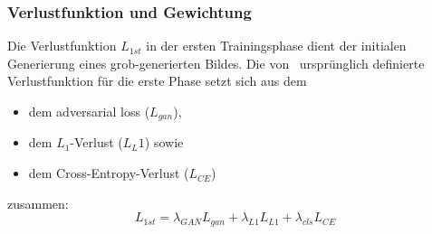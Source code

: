 \subsubsection{Verlustfunktion und Gewichtung}
Die Verlustfunktion $L_{1st}$ in der ersten Trainingsphase dient der initialen Generierung eines grob-generierten Bildes. Die von~\textcite{He_2023_ICCV} ursprünglich definierte Verlustfunktion für die erste Phase setzt sich aus dem
\begin{itemize}
    \item dem adversarial loss ($L_{gan}$),
    \item dem $L_1$-Verlust ($L_L1$) sowie
    \item dem Cross-Entropy-Verlust ($L_{CE}$)
\end{itemize}
zusammen:
\begin{equation}
    L_{1st} = \lambda_{GAN} L_{gan} + \lambda_{L1} L_{L1} + \lambda_{cls} L_{CE}
\end{equation}

